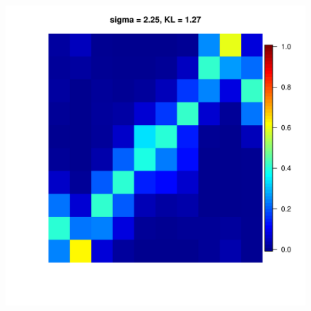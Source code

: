 \documentclass[11pt, oneside]{article}   	%
\begin{document}
\begin{figure}[h!]
{\begin{minipage}[t]{.3\textwidth}
	\end{minipage} 
	\hfill
\begin{minipage}[t]{.3\textwidth}
	\centering
	\includegraphics[width=\textwidth]{figures/Pseudo_alpha1N100n100run1sd2dot25.pdf}
	
\end{minipage} 

 }


\end{figure}
\end{document}
